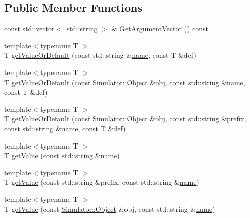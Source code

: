 \subsection*{Public Member Functions}
\begin{DoxyCompactItemize}
\item 
const std\+::vector$<$ std\+::string $>$ \& \hyperlink{class_input_config_registry_a9d84a5e441937e388b583daecf9173f4}{Get\+Argument\+Vector} () const 
\item 
{\footnotesize template$<$typename T $>$ }\\T \hyperlink{class_input_config_registry_a97656799cd73a7ef8321d358665f3cfb}{get\+Value\+Or\+Default} (const std\+::string \&\hyperlink{mtconf_8c_a8f8f80d37794cde9472343e4487ba3eb}{name}, const T \&def)
\item 
{\footnotesize template$<$typename T $>$ }\\T \hyperlink{class_input_config_registry_aeb3e30a1383f18c74c7b1d6d186b46f6}{get\+Value\+Or\+Default} (const \hyperlink{class_simulator_1_1_object}{Simulator\+::\+Object} \&obj, const std\+::string \&\hyperlink{mtconf_8c_a8f8f80d37794cde9472343e4487ba3eb}{name}, const T \&def)
\item 
{\footnotesize template$<$typename T $>$ }\\T \hyperlink{class_input_config_registry_a716b4710d76875f5fc73bed87e5f3141}{get\+Value\+Or\+Default} (const \hyperlink{class_simulator_1_1_object}{Simulator\+::\+Object} \&obj, const std\+::string \&prefix, const std\+::string \&\hyperlink{mtconf_8c_a8f8f80d37794cde9472343e4487ba3eb}{name}, const T \&def)
\item 
{\footnotesize template$<$typename T $>$ }\\T \hyperlink{class_input_config_registry_a7a62eb01437555f96c13f9d8eb214feb}{get\+Value} (const std\+::string \&\hyperlink{mtconf_8c_a8f8f80d37794cde9472343e4487ba3eb}{name})
\item 
{\footnotesize template$<$typename T $>$ }\\T \hyperlink{class_input_config_registry_a5811ed86c320bca6f09b9b8b06197414}{get\+Value} (const std\+::string \&prefix, const std\+::string \&\hyperlink{mtconf_8c_a8f8f80d37794cde9472343e4487ba3eb}{name})
\item 
{\footnotesize template$<$typename T $>$ }\\T \hyperlink{class_input_config_registry_a499dcb45995e948d6cac9ea7de818839}{get\+Value} (const \hyperlink{class_simulator_1_1_object}{Simulator\+::\+Object} \&obj, const std\+::string \&\hyperlink{mtconf_8c_a8f8f80d37794cde9472343e4487ba3eb}{name})

\end{DoxyCompactItemize}
